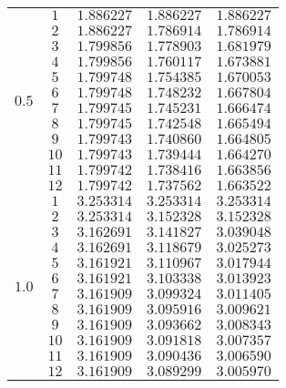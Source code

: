 \documentclass[
    a4paper, aps, twocolumn, floatfix, superscriptaddress,
    nofootinbib]{revtex4-1}
\newcommand{\1}{\mathds{1}}
\begin{document}
\begin{table}
\begin{ruledtabular}
\begin{tabular}{c|c|ccc}
                           &  $1$  & $1.886227$ & $1.886227$ & $1.886227$ \\
                           &  $2$  & $1.886227$ & $1.786914$ & $1.786914$ \\
                           &  $3$  & $1.799856$ & $1.778903$ & $1.681979$ \\
                           &  $4$  & $1.799856$ & $1.760117$ & $1.673881$ \\
                           &  $5$  & $1.799748$ & $1.754385$ & $1.670053$ \\
    \multirow{2}{*}{$0.5$} &  $6$  & $1.799748$ & $1.748232$ & $1.667804$ \\
                           &  $7$  & $1.799745$ & $1.745231$ & $1.666474$ \\
                           &  $8$  & $1.799745$ & $1.742548$ & $1.665494$ \\
                           &  $9$  & $1.799743$ & $1.740860$ & $1.664805$ \\
                           &  $10$ & $1.799743$ & $1.739444$ & $1.664270$ \\
                           &  $11$ & $1.799742$ & $1.738416$ & $1.663856$ \\
                           &  $12$ & $1.799742$ & $1.737562$ & $1.663522$ \\
                \hline

                           &  $1$  & $3.253314$ & $3.253314$ & $3.253314$ \\
                           &  $2$  & $3.253314$ & $3.152328$ & $3.152328$ \\
                           &  $3$  & $3.162691$ & $3.141827$ & $3.039048$ \\
                           &  $4$  & $3.162691$ & $3.118679$ & $3.025273$ \\
                           &  $5$  & $3.161921$ & $3.110967$ & $3.017944$ \\
    \multirow{2}{*}{$1.0$} &  $6$  & $3.161921$ & $3.103338$ & $3.013923$ \\
                           &  $7$  & $3.161909$ & $3.099324$ & $3.011405$ \\
                           &  $8$  & $3.161909$ & $3.095916$ & $3.009621$ \\
                           &  $9$  & $3.161909$ & $3.093662$ & $3.008343$ \\
                           &  $10$ & $3.161909$ & $3.091818$ & $3.007357$ \\
                           &  $11$ & $3.161909$ & $3.090436$ & $3.006590$ \\
                           &  $12$ & $3.161909$ & $3.089299$ & $3.005970$ \\
                \hline


\end{tabular}
\end{ruledtabular}
\end{table}
\end{document}
